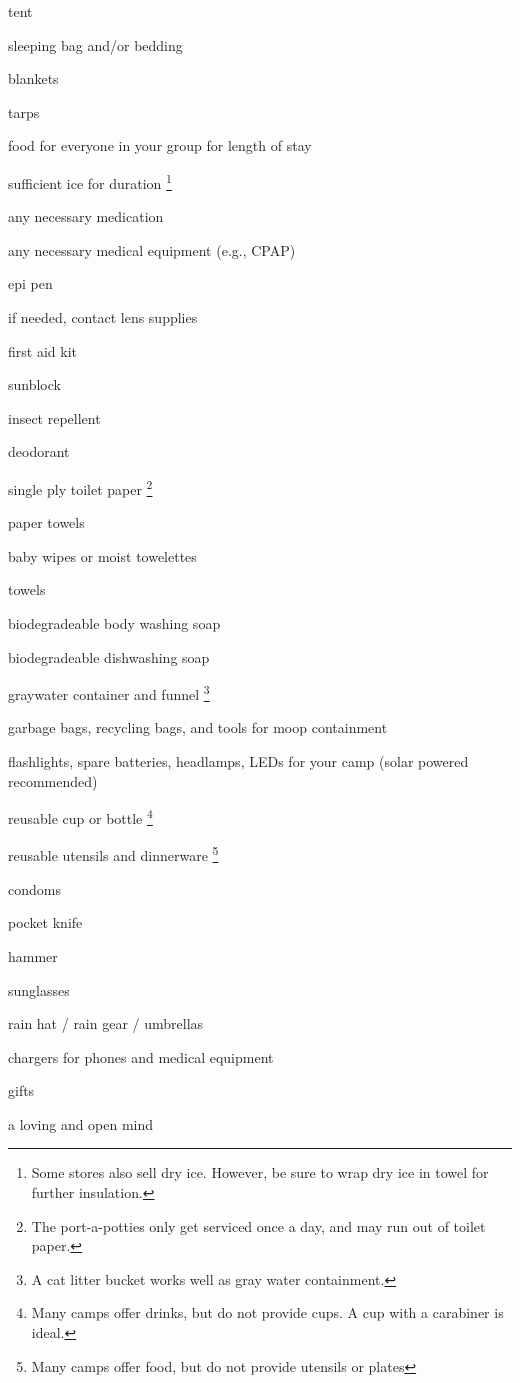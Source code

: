 \begin{multicols}{2}

\begin{checklist}
	\item tent
    \item sleeping bag and/or bedding
    \item blankets
    \item tarps
    \item food for everyone in your group for length of stay
    \item sufficient ice for duration \footnote{Some stores also sell dry ice. However, be sure to wrap dry ice in towel for further insulation.}
    \item any necessary medication
    \item any necessary medical equipment (e.g., CPAP)
    \item epi pen
    \item if needed, contact lens supplies
    \item first aid kit
    \item sunblock
    \item insect repellent
    \item deodorant
    \item single ply toilet paper \footnote{The port-a-potties only get serviced once a day, and may run out of toilet paper.}
    \item paper towels
    \item baby wipes or moist towelettes
    \item towels
    \item biodegradeable body washing soap
    \item biodegradeable dishwashing soap 
    \item \gls{graywater} container and funnel \footnote{A cat litter bucket works well as gray water containment.}
    \item garbage bags, recycling bags, and tools for \gls{moop} containment
    \item flashlights, spare batteries, headlamps, LEDs for your camp  (solar powered recommended) 
    \item reusable cup or bottle \footnote{Many camps offer drinks, but do not provide cups.  A cup with a carabiner is ideal.}
    \item reusable utensils and dinnerware \footnote{Many camps offer food, but do not provide utensils or plates}
    \item condoms
    \item pocket knife
    \item hammer
    \item sunglasses
    \item rain hat / rain gear / umbrellas
    \item chargers for phones and medical equipment
    \item gifts
    \item a loving and open mind
    \item \hrulefill
\end{checklist}


\end{multicols}
